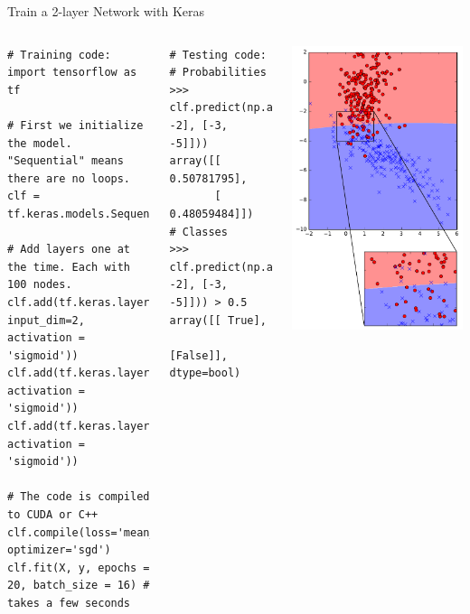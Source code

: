 \documentclass[10pt, aspectratio=169]{beamer} %
\begin{document}
\begin{frame}[fragile]{Train a 2-layer Network with Keras}
\begin{columns}
\begin{lstlisting}
# Training code:
import tensorflow as tf

# First we initialize the model. "Sequential" means there are no loops.
clf = tf.keras.models.Sequential()

# Add layers one at the time. Each with 100 nodes.
clf.add(tf.keras.layers.Dense(100, input_dim=2, activation = 'sigmoid'))
clf.add(tf.keras.layers.Dense(100, activation = 'sigmoid'))
clf.add(tf.keras.layers.Dense(1, activation = 'sigmoid'))

# The code is compiled to CUDA or C++
clf.compile(loss='mean_squared_error', optimizer='sgd')
clf.fit(X, y, epochs = 20, batch_size = 16) # takes a few seconds
\end{lstlisting}
\begin{lstlisting}
# Testing code:
# Probabilities
>>> clf.predict(np.array([[1, -2], [-3, -5]]))
array([[ 0.50781795],
       [ 0.48059484]])
# Classes
>>> clf.predict(np.array([[1, -2], [-3, -5]])) > 0.5
array([[ True],
       [False]], dtype=bool)
\end{lstlisting}
\centerline{\includegraphics[width=\columnwidth]{mlp.pdf}}

\end{columns}
\end{frame}
\end{document}
